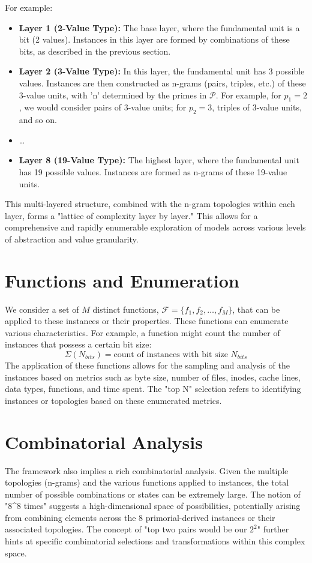 \documentclass{article}
\begin{document}
For example:
\begin{itemize}
    \item \textbf{Layer 1 (2-Value Type):} The base layer, where the fundamental unit is a bit (2 values). Instances in this layer are formed by combinations of these bits, as described in the previous section.
    \item \textbf{Layer 2 (3-Value Type):} In this layer, the fundamental unit has 3 possible values. Instances are then constructed as n-grams (pairs, triples, etc.) of these 3-value units, with 'n' determined by the primes in $\mathcal{P}$. For example, for $p_1=2$, we would consider pairs of 3-value units; for $p_2=3$, triples of 3-value units, and so on.
    \item \ldots
    \item \textbf{Layer 8 (19-Value Type):} The highest layer, where the fundamental unit has 19 possible values. Instances are formed as n-grams of these 19-value units.
\end{itemize}
This multi-layered structure, combined with the n-gram topologies within each layer, forms a "lattice of complexity layer by layer." This allows for a comprehensive and rapidly enumerable exploration of models across various levels of abstraction and value granularity.

\section{Functions and Enumeration}
We consider a set of $M$ distinct functions, $\mathcal{F} = \{f_1, f_2, \ldots, f_M\}$, that can be applied to these instances or their properties. These functions can enumerate various characteristics. For example, a function might count the number of instances that possess a certain bit size:
\[ \Sigma(N_{bits}) = \text{count of instances with bit size } N_{bits} \]
The application of these functions allows for the sampling and analysis of the instances based on metrics such as byte size, number of files, inodes, cache lines, data types, functions, and time spent. The "top N" selection refers to identifying instances or topologies based on these enumerated metrics.

\section{Combinatorial Analysis}
The framework also implies a rich combinatorial analysis. Given the multiple topologies (n-grams) and the various functions applied to instances, the total number of possible combinations or states can be extremely large. The notion of "8^8 times" suggests a high-dimensional space of possibilities, potentially arising from combining elements across the 8 primorial-derived instances or their associated topologies. The concept of "top two pairs would be our $2^2$" further hints at specific combinatorial selections and transformations within this complex space.
\end{document}
